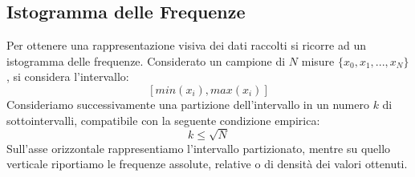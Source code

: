 \documentclass[11pt]{article}
\begin{document}
\subsection{Istogramma delle Frequenze}

Per ottenere una rappresentazione visiva dei dati raccolti si ricorre ad un istogramma delle frequenze. Considerato un campione di $N$ misure $\{x_0, x_1, ..., x_N\}$, si considera l'intervallo: $$[min(x_i), max(x_i)]$$
Consideriamo successivamente una partizione dell'intervallo in un numero $k$ di sottointervalli, compatibile con la seguente condizione empirica: $$k\leq\sqrt{N}$$ Sull'asse orizzontale rappresentiamo l'intervallo partizionato, mentre su quello verticale riportiamo le frequenze assolute, relative o di densità dei valori ottenuti.
\\
\begin{table}[H]
\centering
{}
\end{table}
\end{document}
